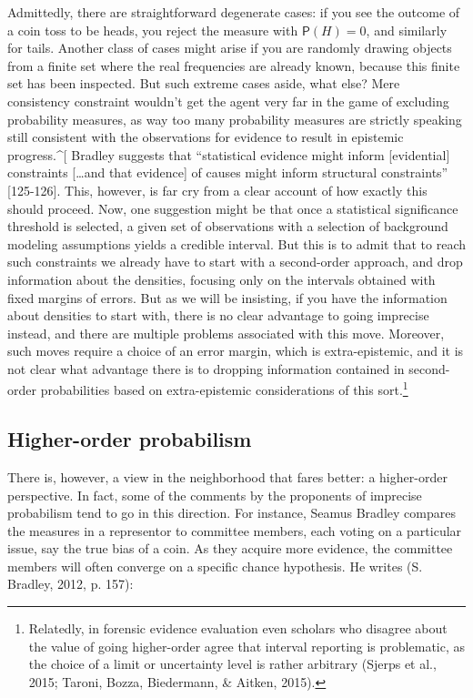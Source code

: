 \documentclass[
  10pt,
  dvipsnames,enabledeprecatedfontcommands]{scrartcl}
\begin{document}
Admittedly, there are straightforward degenerate cases: if you see the
outcome of a coin toss to be heads, you reject the measure with
\(\mathsf{P}(H)=0\), and similarly for tails. Another class of cases
might arise if you are randomly drawing objects from a finite set where
the real frequencies are already known, because this finite set has been
inspected. But such extreme cases aside, what else? Mere consistency
constraint wouldn't get the agent very far in the game of excluding
probability measures, as way too many probability measures are strictly
speaking still consistent with the observations for evidence to result
in epistemic progress.\^{}{[} Bradley suggests that ``statistical
evidence might inform {[}evidential{]} constraints {[}\dots and that
evidence{]} of causes might inform structural constraints''
{[}125-126{]}. This, however, is far cry from a clear account of how
exactly this should proceed. Now, one suggestion might be that once a
statistical significance threshold is selected, a given set of
observations with a selection of background modeling assumptions yields
a credible interval. But this is to admit that to reach such constraints
we already have to start with a second-order approach, and drop
information about the densities, focusing only on the intervals obtained
with fixed margins of errors. But as we will be insisting, if you have
the information about densities to start with, there is no clear
advantage to going imprecise instead, and there are multiple problems
associated with this move. Moreover, such moves require a choice of an
error margin, which is extra-epistemic, and it is not clear what
advantage there is to dropping information contained in second-order
probabilities based on extra-epistemic considerations of this
sort.\footnote{Relatedly, in forensic evidence evaluation even scholars
  who disagree about the value of going higher-order agree that interval
  reporting is problematic, as the choice of a limit or uncertainty
  level is rather arbitrary (Sjerps et al., 2015; Taroni, Bozza,
  Biedermann, \& Aitken, 2015).}

\hypertarget{higher-order-probabilism}{%
\subsection{Higher-order probabilism}\label{higher-order-probabilism}}

There is, however, a view in the neighborhood that fares better: a
higher-order perspective. In fact, some of the comments by the
proponents of imprecise probabilism tend to go in this direction. For
instance, Seamus Bradley compares the measures in a representor to
committee members, each voting on a particular issue, say the true bias
of a coin. As they acquire more evidence, the committee members will
often converge on a specific chance hypothesis. He writes (S. Bradley,
2012, p. 157):
\end{document}
